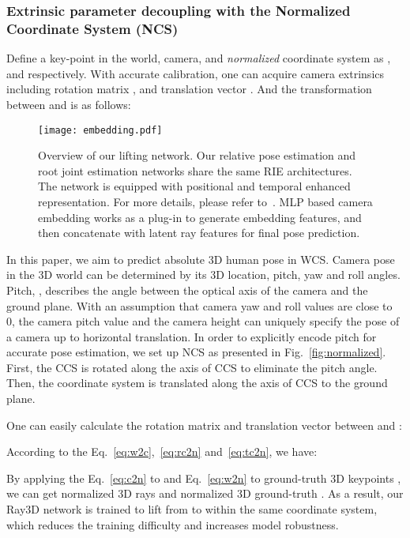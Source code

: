 \documentclass[10pt,twocolumn,letterpaper]{article}
\begin{document}
\subsubsection*{Extrinsic parameter decoupling with the Normalized Coordinate System (NCS)} 
\label{subsec: normalization}

Define a key-point in the world, camera, and \emph{normalized} coordinate system as ,  and  respectively. With accurate calibration, one can acquire camera extrinsics including rotation matrix , and translation vector . And the transformation between  and  is as follows:



\begin{figure}[htbp]
    \centering
	\texttt{[image: embedding.pdf]} 
	\vskip-9pt
	\caption{Overview of our lifting network. Our relative pose estimation and root joint estimation networks share the same RIE architectures. The network is equipped with positional and temporal enhanced representation. For more details, please refer to~\cite{wenkang2021improving}. MLP based camera embedding works as a plug-in to generate embedding features, and then concatenate with latent ray features for final pose prediction.}
	\label{fig:embedding}
	\vspace{-3mm}
\end{figure}



In this paper, we aim to predict absolute 3D human pose in WCS. Camera pose in the 3D world can be determined by its 3D location, pitch, yaw and roll angles. Pitch, , describes the angle between the optical axis of the camera and the ground plane. With an assumption that camera yaw and roll values are close to 0, 
the camera pitch value and the camera height can uniquely specify the pose of a camera up to horizontal translation. In order to explicitly encode pitch for accurate pose estimation, we set up NCS as presented in Fig.~\ref{fig:normalized}. First, the CCS is rotated along the  axis of CCS to eliminate the pitch angle. Then, the coordinate system is translated along the  axis of CCS to the ground plane.  

One can easily calculate the rotation matrix and translation vector between  and :


According to the Eq.~\ref{eq:w2c},~\ref{eq:rc2n} and~\ref{eq:tc2n}, we have:




By applying the Eq.~\ref{eq:c2n} to  and Eq.~\ref{eq:w2n} to ground-truth 3D keypoints , we can get normalized 3D rays  and normalized 3D ground-truth . As a result, our Ray3D network is trained to lift from   to  within the same coordinate system, which reduces the training difficulty and increases model robustness.
\end{document}
